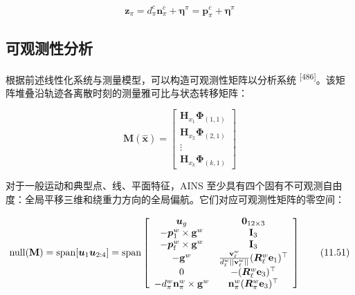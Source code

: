 \begin{equation}
\pmb {z} _ {\pi} = d _ {\pi} ^ {c} \pmb {n} _ {\pi} ^ {c} + \pmb {\eta} ^ {\pi} = \pmb {p} _ {\pi} ^ {c} + \pmb {\eta} ^ {\pi}\tag{11.49}
\end{equation}

\subsection{可观测性分析}

根据前述线性化系统与测量模型，可以构造可观测性矩阵以分析系统 \textsuperscript{[486]}。该矩阵堆叠沿轨迹各离散时刻的测量雅可比与状态转移矩阵：

\begin{equation}
\mathbf {M} (\hat {\boldsymbol {x}}) = \left[ \begin{array}{c} \mathbf {H} _ {x _ {1}} \boldsymbol {\Phi} _ {(1, 1)} \\ \mathbf {H} _ {x _ {2}} \boldsymbol {\Phi} _ {(2, 1)} \\ \vdots \\ \mathbf {H} _ {x _ {k}} \boldsymbol {\Phi} _ {(k, 1)} \end{array} \right]\tag{11.50}
\end{equation}

对于一般运动和典型点、线、平面特征，AINS 至少具有四个固有不可观测自由度：全局平移三维和绕重力方向的全局偏航。它们对应可观测性矩阵的零空间：

\begin{equation}
\mathrm{null} (\mathbf {M}) = \mathrm{span} [ \boldsymbol {u} _ {1} \boldsymbol {u} _ {2: 4} ] = \mathrm{span} \left[ \begin{array}{c c} \boldsymbol {u} _ {g} & \mathbf {0} _ {1 2 \times 3} \\ - \boldsymbol {p} _ {1} ^ {w} \times \mathbf {g} ^ {w} & \mathbf {I} _ {3} \\ - \boldsymbol {p} _ {\mathrm{f}} ^ {w} \times \mathbf {g} ^ {w} & \mathbf {I} _ {3} \\ - \mathbf {g} ^ {w} & \frac {\mathbf {v} _ {\ell} ^ {w}}{d _ {\ell} ^ {w} | | \mathbf {v} _ {\ell} ^ {w} | |} (\boldsymbol {R} _ {\ell} ^ {w} \mathbf {e} _ {1}) ^ {\top} \\ 0 & - (\boldsymbol {R} _ {\ell} ^ {w} \mathbf {e} _ {3}) ^ {\top} \\ - d _ {\pi} ^ {w} \mathbf {n} _ {\pi} ^ {w} \times \mathbf {g} ^ {w} & \mathbf {n} _ {\pi} ^ {w} (\boldsymbol {R} _ {\pi} ^ {w} \mathbf {e} _ {3}) ^ {\top} \end{array} \right]\tag{11.51}
\end{equation}

